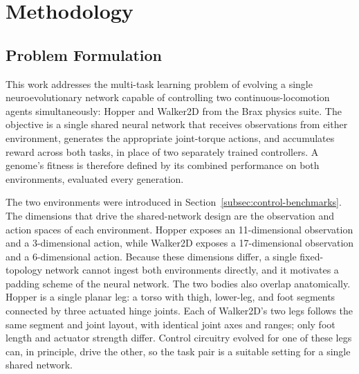 \documentclass[12pt]{article}
\begin{document}


\section{Methodology}
\label{sec:methodology}

\subsection{Problem Formulation}
\label{subsec:problem-formulation}

This work addresses the multi-task learning problem of evolving a single neuroevolutionary network capable of controlling two continuous-locomotion agents simultaneously: Hopper and Walker2D from the Brax physics suite.
The objective is a single shared neural network that receives observations from either environment, generates the appropriate joint-torque actions, and accumulates reward across both tasks, in place of two separately trained controllers.
A genome's fitness is therefore defined by its combined performance on both environments, evaluated every generation.

The two environments were introduced in Section~\ref{subsec:control-benchmarks}. The dimensions that drive the shared-network design are the observation and action spaces of each environment.
Hopper exposes an 11-dimensional observation and a 3-dimensional action, while Walker2D exposes a 17-dimensional observation and a 6-dimensional action.
Because these dimensions differ, a single fixed-topology network cannot ingest both environments directly, and it motivates a padding scheme of the neural network.
The two bodies also overlap anatomically.
Hopper is a single planar leg: a torso with thigh, lower-leg, and foot segments connected by three actuated hinge joints.
Each of Walker2D's two legs follows the same segment and joint layout, with identical joint axes and ranges; only foot length and actuator strength differ.
Control circuitry evolved for one of these legs can, in principle, drive the other, so the task pair is a suitable setting for a single shared network.
\end{document}
